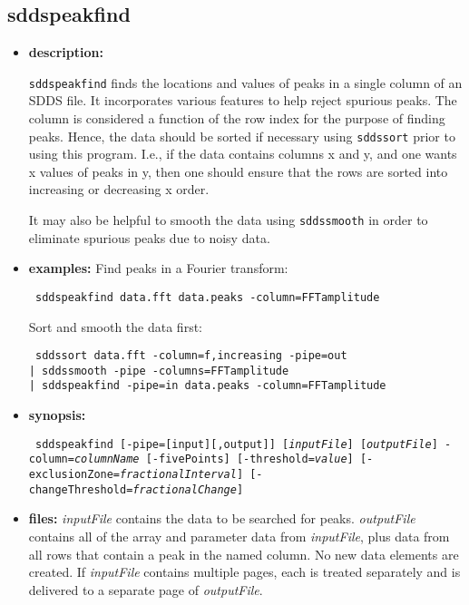 \begin{latexonly}
\newpage
\end{latexonly}
\subsection{sddspeakfind}
\label{sddspeakfind}

\begin{itemize}
\item {\bf description:}

{\tt sddspeakfind} finds the locations and values of peaks in a single column of an SDDS file.  It incorporates
various features to help reject spurious peaks.  The column is considered a function of the row index for the
purpose of finding peaks.  Hence, the data should be sorted if necessary using {\tt sddssort} prior to using this
program.  I.e., if the data contains columns x and y, and one wants x values of peaks in y, then one should
ensure that the rows are sorted into increasing or decreasing x order.

It may also be helpful to smooth the data using {\tt sddssmooth} in order to eliminate spurious peaks due to
noisy data.

\item {\bf examples:} 
Find peaks in a Fourier transform:
\begin{flushleft}{\tt
sddspeakfind data.fft data.peaks -column=FFTamplitude 
}\end{flushleft}
Sort and smooth the data first:
\begin{flushleft}{\tt
sddssort data.fft -column=f,increasing -pipe=out \\
| sddssmooth -pipe -columns=FFTamplitude \\
| sddspeakfind -pipe=in data.peaks -column=FFTamplitude 
}\end{flushleft}

\item {\bf synopsis:} 
\begin{flushleft}{\tt
sddspeakfind [-pipe=[input][,output]] [{\em inputFile}] [{\em outputFile}] 
-column={\em columnName} [-fivePoints] [-threshold={\em value}]
[-exclusionZone={\em fractionalInterval}] [-changeThreshold={\em fractionalChange}]
}\end{flushleft}
\item {\bf files:}
{\em inputFile} contains the data to be searched for peaks.  {\em outputFile} contains all of the array and
parameter data from {\em inputFile}, plus data from all rows that contain a peak in the named column.  No new
data elements are created.  If {\em inputFile} contains multiple pages, each is treated separately and is
delivered to a separate page of {\em outputFile}.


\end{itemize}
